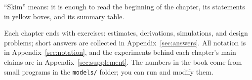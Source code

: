 ``Skim'' means: it is enough to read the beginning of the chapter, its statements in yellow boxes, and its summary table.

Each chapter ends with exercises: estimates, derivations, simulations, and design problems; short answers are collected in Appendix~\ref{sec:answers}. All notation is in Appendix~\ref{sec:notation}, and the experiments behind each chapter's main claims are in Appendix~\ref{sec:supplement}. The numbers in the book come from small programs in the \texttt{models/} folder; you can run and modify them.
